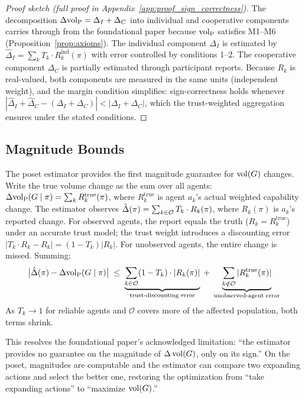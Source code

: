 \begin{proof}[Proof sketch (full proof in Appendix~\ref{app:proof_sign_correctness})]
The decomposition $\Delta {\operatorname{vol}_{\mathrm{P}}} = \Delta_I + \Delta_C$ into
individual and cooperative components carries through from the foundational
paper because ${\operatorname{vol}_{\mathrm{P}}}$ satisfies M1--M6 (Proposition~\ref{prop:axioms}). The
individual component $\Delta_I$ is estimated by $\hat{\Delta}_I = \sum_k T_k
\cdot R_k^{\mathrm{ind}}(\pi)$ with error controlled by conditions 1--2. The
cooperative component $\Delta_C$ is partially estimated through participant
reports. Because $R_k$ is real-valued, both components are measured in the same
units (independent weight), and the margin condition simplifies: sign-correctness
holds whenever $|\hat{\Delta}_I + \hat{\Delta}_C - (\Delta_I + \Delta_C)| <
|\Delta_I + \Delta_C|$, which the trust-weighted aggregation ensures under the
stated conditions.
\end{proof}

\subsection{Magnitude Bounds}

The poset estimator provides the first magnitude guarantee for $\operatorname{vol}(G)$
changes. Write the true volume change as the sum over all agents:
$\Delta {\operatorname{vol}_{\mathrm{P}}}(G \mid \pi) = \sum_k R_k^{\mathrm{true}}(\pi)$,
where $R_k^{\mathrm{true}}$ is agent $a_k$'s actual weighted capability change.
The estimator observes $\hat{\Delta}(\pi) = \sum_{k \in \mathcal{O}} T_k \cdot
R_k(\pi)$, where $R_k(\pi)$ is $a_k$'s reported change. For observed agents,
the report equals the truth ($R_k = R_k^{\mathrm{true}}$) under an accurate
trust model; the trust weight introduces a discounting error
$|T_k \cdot R_k - R_k| = (1 - T_k)|R_k|$. For unobserved agents, the entire
change is missed. Summing:
\begin{equation}
\label{eq:magnitude_bound}
\bigl|\hat{\Delta}(\pi) - \Delta {\operatorname{vol}_{\mathrm{P}}}(G \mid \pi)\bigr|
  \;\leq\; \underbrace{\sum_{k \in \mathcal{O}} (1 - T_k) \cdot |R_k(\pi)|}_{\text{trust-discounting error}}
  \;+\; \underbrace{\sum_{k \notin \mathcal{O}} |R_k^{\mathrm{true}}(\pi)|}_{\text{unobserved-agent error}}
\end{equation}
As $T_k \to 1$ for reliable agents and $\mathcal{O}$ covers more of the
affected population, both terms shrink.

This resolves the foundational paper's acknowledged limitation: ``the estimator
provides no guarantee on the magnitude of $\Delta \operatorname{vol}(G)$, only on its sign.''
On the poset, magnitudes are computable and the estimator can compare two
expanding actions and select the better one, restoring the optimization from
``take expanding actions'' to ``maximize $\operatorname{vol}(G)$.''
